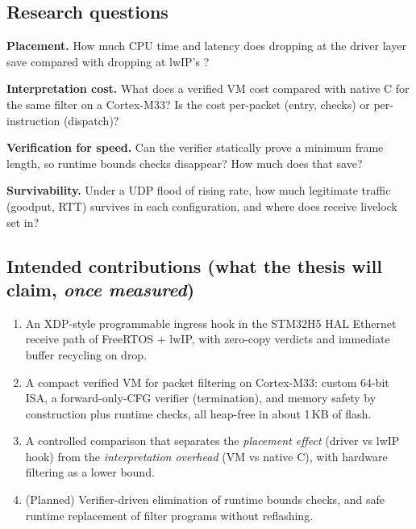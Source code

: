 \documentclass[10pt,a4paper]{article}
\begin{document}
\subsection{Research questions}
\begin{description}[leftmargin=2.6em,style=nextline,itemsep=3pt]
  \item[RQ1] \textbf{Placement.} How much CPU time and latency does dropping at the driver layer save compared with dropping at lwIP's ?
  \item[RQ2] \textbf{Interpretation cost.} What does a verified VM cost compared with native C for the same filter on a Cortex-M33? Is the cost per-packet (entry, checks) or per-instruction (dispatch)?
  \item[RQ3] \textbf{Verification for speed.} Can the verifier statically prove a minimum frame length, so runtime bounds checks disappear? How much does that save?
  \item[RQ4] \textbf{Survivability.} Under a UDP flood of rising rate, how much legitimate traffic (goodput, RTT) survives in each configuration, and where does receive livelock set in?
\end{description}

\subsection{Intended contributions (what the thesis will claim, \emph{once measured})}
\begin{enumerate}[label=\textbf{C\arabic*},leftmargin=2.2em]
  \item An XDP-style programmable ingress hook in the STM32H5 HAL Ethernet receive path of FreeRTOS + lwIP, with zero-copy verdicts and immediate buffer recycling on drop.
  \item A compact verified VM for packet filtering on Cortex-M33: custom 64-bit ISA, a forward-only-CFG verifier (termination), and memory safety by construction plus runtime checks, all heap-free in about 1\,KB of flash.
  \item A controlled comparison that separates the \emph{placement effect} (driver vs lwIP hook) from the \emph{interpretation overhead} (VM vs native C), with hardware filtering as a lower bound.
  \item (Planned) Verifier-driven elimination of runtime bounds checks, and safe runtime replacement of filter programs without reflashing.
\end{enumerate}
\end{document}
